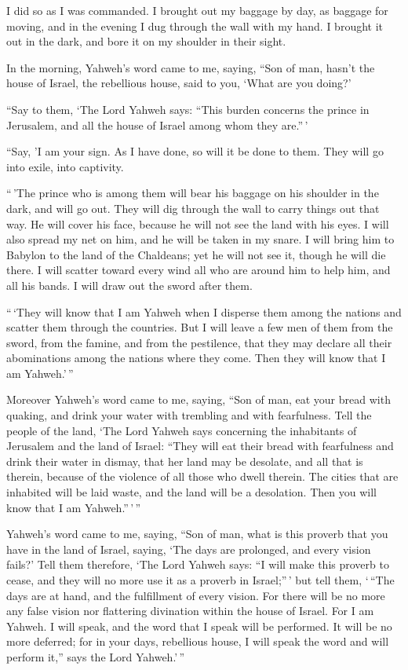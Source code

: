  I did so as I was commanded. I brought out my baggage by
day, as baggage for moving, and in the evening I dug through the wall
with my hand. I brought it out in the dark, and bore it on my shoulder
in their sight.

 In the morning, Yahweh's word came to me, saying,
 ``Son of man, hasn't the house of Israel, the rebellious
house, said to you, `What are you doing?'

 ``Say to them, `The Lord Yahweh says: ``This burden
concerns the prince in Jerusalem, and all the house of Israel among whom
they are.''\,'

 ``Say, 'I am your sign. As I have done, so will it be
done to them. They will go into exile, into captivity.

 ``\,'The prince who is among them will bear his baggage
on his shoulder in the dark, and will go out. They will dig through the
wall to carry things out that way. He will cover his face, because he
will not see the land with his eyes.  I will also spread
my net on him, and he will be taken in my snare. I will bring him to
Babylon to the land of the Chaldeans; yet he will not see it, though he
will die there.  I will scatter toward every wind all who
are around him to help him, and all his bands. I will draw out the sword
after them.

 ``\,`They will know that I am Yahweh when I disperse
them among the nations and scatter them through the countries.
 But I will leave a few men of them from the sword, from
the famine, and from the pestilence, that they may declare all their
abominations among the nations where they come. Then they will know that
I am Yahweh.'\,''

 Moreover Yahweh's word came to me, saying,
 ``Son of man, eat your bread with quaking, and drink
your water with trembling and with fearfulness.  Tell the
people of the land, `The Lord Yahweh says concerning the inhabitants of
Jerusalem and the land of Israel: ``They will eat their bread with
fearfulness and drink their water in dismay, that her land may be
desolate, and all that is therein, because of the violence of all those
who dwell therein.  The cities that are inhabited will be
laid waste, and the land will be a desolation. Then you will know that I
am Yahweh.''\,'\,''

 Yahweh's word came to me, saying,  ``Son
of man, what is this proverb that you have in the land of Israel,
saying, `The days are prolonged, and every vision fails?'
 Tell them therefore, `The Lord Yahweh says: ``I will
make this proverb to cease, and they will no more use it as a proverb in
Israel;''\,' but tell them, `\,``The days are at hand, and the
fulfillment of every vision.  For there will be no more
any false vision nor flattering divination within the house of Israel.
 For I am Yahweh. I will speak, and the word that I speak
will be performed. It will be no more deferred; for in your days,
rebellious house, I will speak the word and will perform it,'' says the
Lord Yahweh.'\,''

